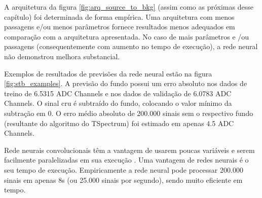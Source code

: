 \documentclass[a4paper,12pt,oneside]{book}
\begin{document}

\par A arquitetura da figura \ref{fig:arq_source_to_bkg} (assim como as próximas desse capítulo) foi determinada de forma empírica. Uma arquitetura com menos passagens e/ou menos parâmetros fornece resultados menos adequados em comparação com a arquitetura apresentada. No caso de mais parâmetros e /ou passagens (consequentemente com aumento no tempo de execução), a rede neural não demonstrou melhora substancial.

\par Exemplos de resultados de previsões da rede neural estão na figura \ref{fig:stb_examples}. A previsão do fundo possui um erro absoluto nos dados de treino de 6.5315 ADC Channels e nos dados de validação de 6.0783 ADC Channels. O sinal cru é subtraído do fundo, colocando o valor mínimo da subtração em 0. O erro médio absoluto de 200.000 sinais sem o respectivo fundo (resultante do algoritmo do TSpectrum) foi estimado em apenas 4.5 ADC Channels.

\par Rede neurais convolucionais têm a vantagem de usarem poucas variáveis e serem facilmente paralelizadas em sua execução \cite{mlbook}. Uma vantagem de redes neurais é o seu tempo de execução. Empiricamente a rede neural pode processar 200.000 sinais em apenas 8s (ou 25.000 sinais por segundo), sendo muito eficiente em tempo.
\end{document}
